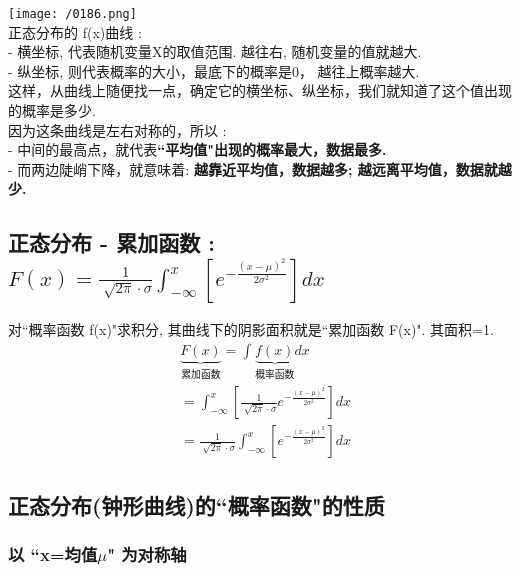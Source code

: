 \documentclass[UTF8]{ctexart}
\begin{document}
	\texttt{[image: /0186.png]} \\
	
	
	正态分布的 f(x)曲线 : \\
	- 横坐标, 代表随机变量X的取值范围. 越往右, 随机变量的值就越大. \\
	- 纵坐标, 则代表概率的大小，最底下的概率是0， 越往上概率越大. \\	
	这样，从曲线上随便找一点，确定它的横坐标、纵坐标，我们就知道了这个值出现的概率是多少. \\
	
	因为这条曲线是左右对称的，所以 : \\
	- 中间的最高点，就代表\textbf{``平均值"出现的概率最大，数据最多.} \\
	- 而两边陡峭下降，就意味着: \textbf{越靠近平均值，数据越多; 越远离平均值，数据就越少.} 
	


	
	
	
	\subsection{正态分布 - 累加函数 : $\boxed{
			F(x)=\frac{1}{\sqrt[]{2\pi}\cdot \sigma}\int_{-\infty}^x{\left[ e^{-\frac{(x-\mu )^2}{2\sigma ^2}} \right]}dx
		}$ }
	
	对``概率函数 f(x)"求积分, 其曲线下的阴影面积就是``累加函数 F(x)". 其面积=1. \\
	
	
	\begin{align*}  %
	&\underset{\text{累加函数}}{\underbrace{F(x)}}=\int_{}^{}{\underset{\text{概率函数}}{\underbrace{f(x)}}}dx\\
&=\int_{-\infty}^x{\left[ \frac{1}{\sqrt[]{2\pi}\cdot \sigma}e^{-\frac{(x-\mu )^2}{2\sigma ^2}} \right]}dx\\
&=\frac{1}{\sqrt[]{2\pi}\cdot \sigma}\int_{-\infty}^x{\left[ e^{-\frac{(x-\mu )^2}{2\sigma ^2}} \right]}dx
	\end{align*}



\vspace{1em} 
\subsection{正态分布(钟形曲线)的``概率函数"的性质}



\subsubsection{以 ``x=均值$\mu$" 为对称轴}
\end{document}
